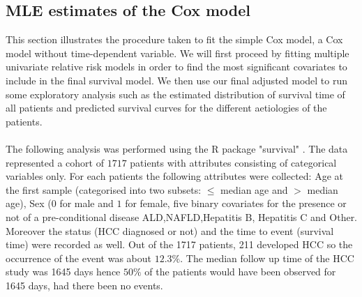 \documentclass[11pt,twoside]{article}
\numberwithin{Theorem}{section}
\numberwithin{Definition}{section}
\numberwithin{Lemma}{section}
\numberwithin{Algorithm}{section}
\numberwithin{equation}{section}
\begin{document}
\subsection{MLE estimates of the Cox model}
\label{sec:Simple_cox}
This section illustrates the procedure taken to fit the simple Cox model, a Cox model without time-dependent variable. We will first proceed by fitting multiple univariate relative risk models in order to find the most significant covariates to include in the final survival model. We then use our final adjusted model to run some exploratory analysis such as the estimated distribution of survival time of all patients and  predicted survival curves for the different aetiologies of the patients.  \\ \\
The following analysis was performed using the R package "survival" \cite{therneau2015package}. The data represented a cohort of $1717$ patients with attributes consisting of categorical variables only. For each patients the following attributes were collected: Age at the first sample (categorised into two subsets: $\leq$ median age and $>$ median age), Sex ($0$ for male and $1$ for female, five binary covariates for the presence or not of a pre-conditional disease ALD,NAFLD,Hepatitis B, Hepatitis C and Other. Moreover the status (HCC diagnosed or not) and the time to event (survival time) were recorded as well. Out of the 1717 patients, 211 developed HCC so the occurrence of the event was about $12.3\%$. The median follow up time of the HCC study was 1645 days hence $50\%$ of the patients would have been observed for 1645 days, had there been no events.\\
\\
\end{document}
